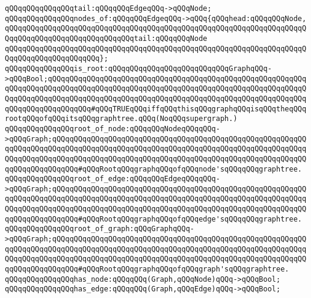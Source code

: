 \verb|qQQqqQQqqQQqqQQqtail:qQQqqQQqEdgeqQQq->qQQqNode;|\newline
\newline
\verb|qQQqqQQqqQQqqQQqnodes_of:qQQqqQQqEdgeqQQq->qQQq{qQQqhead:qQQqqQQqNode,|\newline
\verb|qQQqqQQqqQQqqQQqqQQqqQQqqQQqqQQqqQQqqQQqqQQqqQQqqQQqqQQqqQQqqQQqqQQqqQQqqQQqqQQqqQQqqQQqqQQqqQQqqQQqtail:qQQqqQQqNode|\newline
\verb|qQQqqQQqqQQqqQQqqQQqqQQqqQQqqQQqqQQqqQQqqQQqqQQqqQQqqQQqqQQqqQQqqQQqqQQqqQQqqQQqqQQqqQQqqQQq};|\newline
\newline
\verb|qQQqqQQqqQQqqQQqis_root:qQQqqQQqqQQqqQQqqQQqqQQqqQQqGraphqQQq->qQQqBool;qQQqqQQqqQQqqQQqqQQqqQQqqQQqqQQqqQQqqQQqqQQqqQQqqQQqqQQqqQQqqQQqqQQqqQQqqQQqqQQqqQQqqQQqqQQqqQQqqQQqqQQqqQQqqQQqqQQqqQQqqQQqqQQqqQQqqQQqqQQqqQQqqQQqqQQqqQQqqQQqqQQqqQQqqQQqqQQqqQQqqQQqqQQqqQQqqQQqqQQqqQQqqQQqqQQqqQQqqQQq#qQQqTRUEqQQqiffqQQqthisqQQqgraphqQQqisqQQqtheqQQqrootqQQqofqQQqitsqQQqgraphtree.qQQq(NoqQQqsupergraph.)|\newline
\newline
\verb|qQQqqQQqqQQqqQQqroot_of_node:qQQqqQQqNodeqQQqqQQq->qQQqGraph;qQQqqQQqqQQqqQQqqQQqqQQqqQQqqQQqqQQqqQQqqQQqqQQqqQQqqQQqqQQqqQQqqQQqqQQqqQQqqQQqqQQqqQQqqQQqqQQqqQQqqQQqqQQqqQQqqQQqqQQqqQQqqQQqqQQqqQQqqQQqqQQqqQQqqQQqqQQqqQQqqQQqqQQqqQQqqQQqqQQqqQQqqQQqqQQqqQQqqQQqqQQqqQQqqQQqqQQq#qQQqRootqQQqgraphqQQqofqQQqnode'sqQQqqQQqgraphtree.|\newline
\verb|qQQqqQQqqQQqqQQqroot_of_edge:qQQqqQQqEdgeqQQqqQQq->qQQqGraph;qQQqqQQqqQQqqQQqqQQqqQQqqQQqqQQqqQQqqQQqqQQqqQQqqQQqqQQqqQQqqQQqqQQqqQQqqQQqqQQqqQQqqQQqqQQqqQQqqQQqqQQqqQQqqQQqqQQqqQQqqQQqqQQqqQQqqQQqqQQqqQQqqQQqqQQqqQQqqQQqqQQqqQQqqQQqqQQqqQQqqQQqqQQqqQQqqQQqqQQqqQQqqQQqqQQqqQQq#qQQqRootqQQqgraphqQQqofqQQqedge'sqQQqqQQqgraphtree.|\newline
\verb|qQQqqQQqqQQqqQQqroot_of_graph:qQQqGraphqQQq->qQQqGraph;qQQqqQQqqQQqqQQqqQQqqQQqqQQqqQQqqQQqqQQqqQQqqQQqqQQqqQQqqQQqqQQqqQQqqQQqqQQqqQQqqQQqqQQqqQQqqQQqqQQqqQQqqQQqqQQqqQQqqQQqqQQqqQQqqQQqqQQqqQQqqQQqqQQqqQQqqQQqqQQqqQQqqQQqqQQqqQQqqQQqqQQqqQQqqQQqqQQqqQQqqQQqqQQqqQQqqQQq#qQQqRootqQQqgraphqQQqofqQQqgraph'sqQQqgraphtree.|\newline
\newline
\verb|qQQqqQQqqQQqqQQqhas_node:qQQqqQQq(Graph,qQQqNode)qQQq->qQQqBool;|\newline
\verb|qQQqqQQqqQQqqQQqhas_edge:qQQqqQQq(Graph,qQQqEdge)qQQq->qQQqBool;|\newline
\newline

